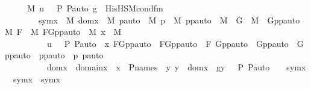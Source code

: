 \begin{isabellebody}
\ \isanewline
\ \ \isamarkupfalse%
\ {\isachardoublequoteopen}M{\isacharcomma}{\kern0pt}\ {\isacharbrackleft}{\kern0pt}{\isasymlangle}u{\isacharcomma}{\kern0pt}\ {\isasymF}{\isacharcomma}{\kern0pt}\ {\isasymG}{\isacharcomma}{\kern0pt}\ P{\isacharcomma}{\kern0pt}\ P{\isacharunderscore}{\kern0pt}auto{\isasymrangle}{\isacharcomma}{\kern0pt}\ g{\isacharbrackright}{\kern0pt}\ {\isasymTurnstile}\ His{\isacharunderscore}{\kern0pt}HS{\isacharunderscore}{\kern0pt}M{\isacharunderscore}{\kern0pt}cond{\isacharunderscore}{\kern0pt}fm{\isacharparenleft}{\kern0pt}{}{\isacharcomma}{\kern0pt}\ {}{\isacharparenright}{\kern0pt}\ {\isasymlongleftrightarrow}\ \isanewline
\ \ \ \ \ \ \ \ {\isacharparenleft}{\kern0pt}{\isasymexists}symx\ {\isasymin}\ M{\isachardot}{\kern0pt}\ {\isasymexists}domx\ {\isasymin}\ M{\isachardot}{\kern0pt}\ {\isasymexists}pauto\ {\isasymin}\ M{\isachardot}{\kern0pt}\ {\isasymexists}p\ {\isasymin}\ M{\isachardot}{\kern0pt}\ {\isasymexists}ppauto\ {\isasymin}\ M{\isachardot}{\kern0pt}\ \ {\isasymexists}G\ {\isasymin}\ M{\isachardot}{\kern0pt}\ \ {\isasymexists}Gppauto\ {\isasymin}\ M{\isachardot}{\kern0pt}\ {\isasymexists}F\ {\isasymin}\ M{\isachardot}{\kern0pt}\ {\isasymexists}FGppauto\ {\isasymin}\ M{\isachardot}{\kern0pt}\ {\isasymexists}x\ {\isasymin}\ M{\isachardot}{\kern0pt}\isanewline
\ \ \ \ \ \ \ \ \ \ {\isasymlangle}u{\isacharcomma}{\kern0pt}\ {\isasymF}{\isacharcomma}{\kern0pt}\ {\isasymG}{\isacharcomma}{\kern0pt}\ P{\isacharcomma}{\kern0pt}\ P{\isacharunderscore}{\kern0pt}auto{\isasymrangle}\ {\isacharequal}{\kern0pt}\ {\isacharless}{\kern0pt}x{\isacharcomma}{\kern0pt}\ FGppauto{\isachargreater}{\kern0pt}\ {\isasymand}\ FGppauto\ {\isacharequal}{\kern0pt}\ {\isacharless}{\kern0pt}F{\isacharcomma}{\kern0pt}\ Gppauto{\isachargreater}{\kern0pt}\ {\isasymand}\ Gppauto\ {\isacharequal}{\kern0pt}\ {\isacharless}{\kern0pt}G{\isacharcomma}{\kern0pt}\ ppauto{\isachargreater}{\kern0pt}\ {\isasymand}\ ppauto\ {\isacharequal}{\kern0pt}\ {\isacharless}{\kern0pt}p{\isacharcomma}{\kern0pt}\ pauto{\isachargreater}{\kern0pt}\ {\isasymand}\ \isanewline
\ \ \ \ \ \ \ \ \ \ domx\ {\isacharequal}{\kern0pt}\ domain{\isacharparenleft}{\kern0pt}x{\isacharparenright}{\kern0pt}\ {\isasymand}\ x\ {\isasymin}\ P{\isacharunderscore}{\kern0pt}names\ {\isasymand}\ {\isacharparenleft}{\kern0pt}{\isasymforall}y{\isachardot}{\kern0pt}\ y\ {\isasymin}\ domx\ {\isasymlongrightarrow}\ g{\isacharbackquote}{\kern0pt}{\isasymlangle}y{\isacharcomma}{\kern0pt}\ {\isasymF}{\isacharcomma}{\kern0pt}\ {\isasymG}{\isacharcomma}{\kern0pt}\ P{\isacharcomma}{\kern0pt}\ P{\isacharunderscore}{\kern0pt}auto{\isasymrangle}\ {\isacharequal}{\kern0pt}\ {}{\isacharparenright}{\kern0pt}\ {\isasymand}\ symx\ {\isacharequal}{\kern0pt}\ sym{\isacharparenleft}{\kern0pt}x{\isacharparenright}{\kern0pt}\ {\isasymand}\ symx\ {\isasymin}\ {\isasymF}{\isacharparenright}{\kern0pt}{\isachardoublequoteclose}\ \ \ \isanewline

\end{isabellebody}
